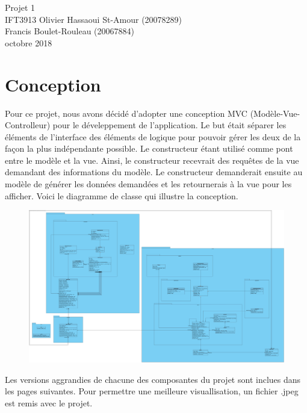 \documentclass[12pt]{article} %
\begin{document}
\begin{center}
	\thispagestyle{empty}
	\parskip=14pt%
	\vspace*{3\parskip}%
	Projet 1 \\
	IFT3913
	\bigbreak\bigbreak\bigbreak\bigbreak\bigbreak\bigbreak
	Olivier Hassaoui St-Amour (20078289)\\
	Francis Boulet-Rouleau (20067884)\\
	\bigbreak\bigbreak\bigbreak\bigbreak\bigbreak{} octobre 2018
\end{center}
\newpage

\section{Conception}
Pour ce projet, nous avons décidé d'adopter une conception MVC (Modèle-Vue-Controlleur) pour le déveleppement de l'application.  Le but était séparer les éléments de l'interface des éléments de logique pour pouvoir gérer les deux de la façon la plus indépendante possible.  Le constructeur étant utilisé comme pont entre le modèle et la vue.  Ainsi, le constructeur recevrait des requêtes de la vue demandant des informations du modèle.  Le constructeur demanderait ensuite au modèle de générer les données demandées et les retournerais à la vue pour les afficher.  Voici le diagramme de classe qui illustre la conception.
\begin{figure}[h]
  \includegraphics[width=\linewidth]{img/ClassDiagram.jpg}
  \label{fig:classdiagram}
\end{figure}

Les versions aggrandies de chacune des composantes du projet sont inclues dans les pages suivantes.  Pour permettre une meilleure visuallisation, un fichier .jpeg est remis avec le projet.
\end{document}
